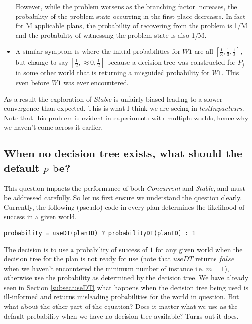 \documentclass[a4paper]{article}
\newcommand{\cc}{\emph{Concurrent}\xspace}
\newcommand{\st}{\emph{Stable}\xspace}
\newcommand{\tiv}{\emph{testImpactvars}\xspace}
\newcommand{\dt}{{decision tree}\xspace}
\begin{document}
\begin{itemize}
However, while the problem worsens as the branching factor increases, the probability of the problem state occurring in the first place decreases. In fact for M applicable plans, the probability of recovering from the problem is 1/M and the probability of witnessing the problem state is also 1/M.

\item A similar symptom is where the initial probabilities for $W1$ are all $[\frac{1}{3},\frac{1}{3},\frac{1}{3}]$, but change to say $[\frac{1}{2},\approx0,\frac{1}{2}]$ because a \dt was constructed for $P_j$ in some other world that is returning a misguided probability for $W1$. This even before $W1$ was ever encountered.

\end{itemize}

As a result the exploration of \st is unfairly biased leading to a slower convergence than expected. This is what I think we are seeing in \tiv. Note that this problem is evident in experiments with multiple worlds, hence why we haven't come across it earlier.

\subsection{When no \dt exists, what should the default $p$ be?}
\label{subsec:defaultP}

This question impacts the performance of both \cc and \st, and must be addressed carefully. So let us first ensure we understand the question clearly. Currently, the following (pseudo) code in every plan determines the likelihood of success in a given world.

\begin{verbatim}
probability = useDT(planID) ? probabilityDT(planID) : 1
\end{verbatim}

The decision is to use a probability of success of $1$ for any given world when the \dt for the plan is not ready for use (note that $useDT$ returns $false$ when we haven't encountered the minimum number of instance i.e. $m=1$), otherwise use the probability as determined by the \dt. We have already seen in Section \ref{subsec:useDT} what happens when the \dt being used is ill-informed and returns misleading probabilities for the world in question. But what about the other part of the equation? Does it matter what we use as the default probability when we have no \dt available? Turns out it does.
\end{document}
